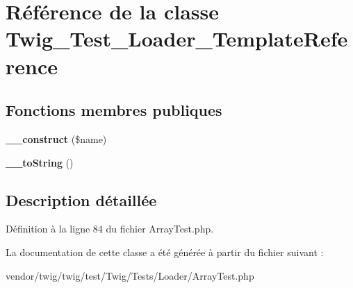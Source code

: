 \hypertarget{class_twig___test___loader___template_reference}{}\section{Référence de la classe Twig\+\_\+\+Test\+\_\+\+Loader\+\_\+\+Template\+Reference}
\label{class_twig___test___loader___template_reference}
\subsection*{Fonctions membres publiques}
\begin{DoxyCompactItemize}
\item 
{\bfseries \+\_\+\+\_\+construct} (\$name)\hypertarget{class_twig___test___loader___template_reference_a4717bbfc70a40a57ee741ed70766c309}{}\label{class_twig___test___loader___template_reference_a4717bbfc70a40a57ee741ed70766c309}

\item 
{\bfseries \+\_\+\+\_\+to\+String} ()\hypertarget{class_twig___test___loader___template_reference_a7516ca30af0db3cdbf9a7739b48ce91d}{}\label{class_twig___test___loader___template_reference_a7516ca30af0db3cdbf9a7739b48ce91d}

\end{DoxyCompactItemize}


\subsection{Description détaillée}


Définition à la ligne 84 du fichier Array\+Test.\+php.



La documentation de cette classe a été générée à partir du fichier suivant \+:\begin{DoxyCompactItemize}
\item 
vendor/twig/twig/test/\+Twig/\+Tests/\+Loader/Array\+Test.\+php\end{DoxyCompactItemize}
